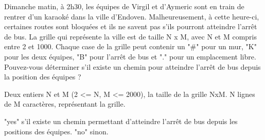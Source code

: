 \problemname{\problemyamlname}


Dimanche matin, à 2h30, les équipes de Virgil et d'Aymeric sont en train de rentrer d'un karaoké dans la ville d'Endoven.
Malheureusement, à cette heure-ci, certaines routes sont bloquées et ils ne savent pas s'ils pourront atteindre l'arrêt de bus. 
La grille qui représente la ville est de taille N x M, avec N et M compris entre 2 et 1000.
Chaque case de la grille peut contenir un "#" pour un mur, "K" pour les deux équipes, "B" pour l'arrêt de bus et "." pour un emplacement libre. 
Pouvez-vous déterminer s'il existe un chemin pour atteindre l'arrêt de bus depuis la position des équipes ?

\begin{Input}
    Deux entiers N et M (2 <= N, M <= 2000), la taille de la grille NxM.
    N lignes de M caractères, représentant la grille.
\end{Input}

\begin{Output}
    "yes" s'il existe un chemin permettant d'atteindre l'arrêt de bus depuis les positions des équipes.
    "no" sinon.
\end{Output}
